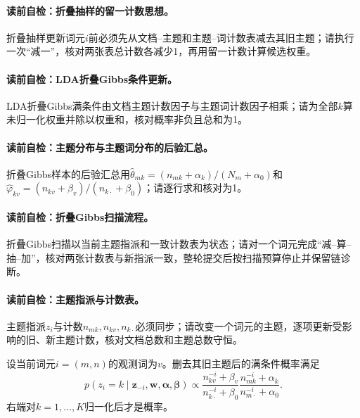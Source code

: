 \paragraph{读前自检：折叠抽样的留一计数思想。}折叠抽样更新词元$i$前必须先从文档--主题和主题--词计数表减去其旧主题；请执行一次“减一”，核对两张表总计数各减少1，再用留一计数计算候选权重。\par
\paragraph{读前自检：LDA折叠Gibbs条件更新。}LDA折叠Gibbs满条件由文档主题计数因子与主题词计数因子相乘；请为全部$k$算未归一化权重并除以权重和，核对概率非负且总和为1。\par
\paragraph{读前自检：主题分布与主题词分布的后验汇总。}折叠Gibbs样本的后验汇总用$\widehat\theta_{mk}=(n_{mk}+\alpha_k)/(N_m+\alpha_0)$和$\widehat\varphi_{kv}=(n_{kv}+\beta_v)/(n_{k\cdot}+\beta_0)$；请逐行求和核对为1。\par
\paragraph{读前自检：折叠Gibbs扫描流程。}折叠Gibbs扫描以当前主题指派和一致计数表为状态；请对一个词元完成“减--算--抽--加”，核对两张计数表与新指派一致，整轮提交后按扫描预算停止并保留链诊断。\par
\paragraph{读前自检：主题指派与计数表。}主题指派$z_i$与计数$n_{mk},n_{kv},n_{k\cdot}$必须同步；请改变一个词元的主题，逐项更新受影响的旧、新主题计数，核对文档总数和主题总数守恒。\par


\begin{proposition}[折叠Gibbs满条件分布]\label{prop:V5-C06-gibbs-conditional}
设当前词元$i=(m,n)$的观测词为$v$。删去其旧主题后的满条件概率满足
\begin{equation}
p(z_i=k\mid\boldsymbol z_{-i},\boldsymbol w,
\boldsymbol\alpha,\boldsymbol\beta)
\propto
\frac{n_{kv}^{-i}+\beta_v}{n_{k\cdot}^{-i}+\beta_0}
\frac{n_{mk}^{-i}+\alpha_k}{n_{m\cdot}^{-i}+\alpha_0}.
\label{eq:V5-C06-gibbs-conditional}
\end{equation}
右端对$k=1,\ldots,K$归一化后才是概率。
\end{proposition}

